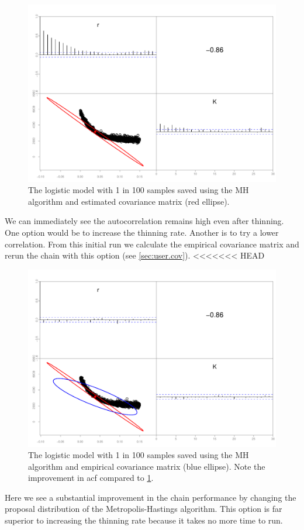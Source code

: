 \documentclass{article}\usepackage[]{graphicx}\usepackage[]{color}
\begin{document}
\begin{figure}[h]
  \centering
  \includegraphics[width=5in]{../plots/logistic_mh.pdf}
  \caption{The logistic model with 1 in 100 samples saved
    using the MH algorithm and estimated covariance matrix
    (red ellipse).}
  \label{fig:logistic_mh}
\end{figure}
We can immediately see the autocorrelation remains high even
after thinning. One option would be to increase the thinning
rate. Another is to try a lower correlation. From this
initial run we calculate the empirical covariance matrix and
rerun the chain with this option (see \ref{sec:user.cov}).
<<<<<<< HEAD

\begin{figure}[h]
  \centering
  \includegraphics[width=5in]{../plots/logistic_mh2.pdf}
  \caption{The logistic model with 1 in 100 samples saved
    using the MH algorithm and empirical covariance matrix
    (blue ellipse). Note the improvement in acf compared to
    \ref{fig:logistic_mh}.}
  \label{fig:logistic_mh2}
\end{figure}
Here we see a substantial improvement in the chain
performance by changing the proposal distribution of the
Metropolis-Hastings algorithm. This option is far superior
to increasing the thinning rate because it takes no more
time to run.
\end{document}
